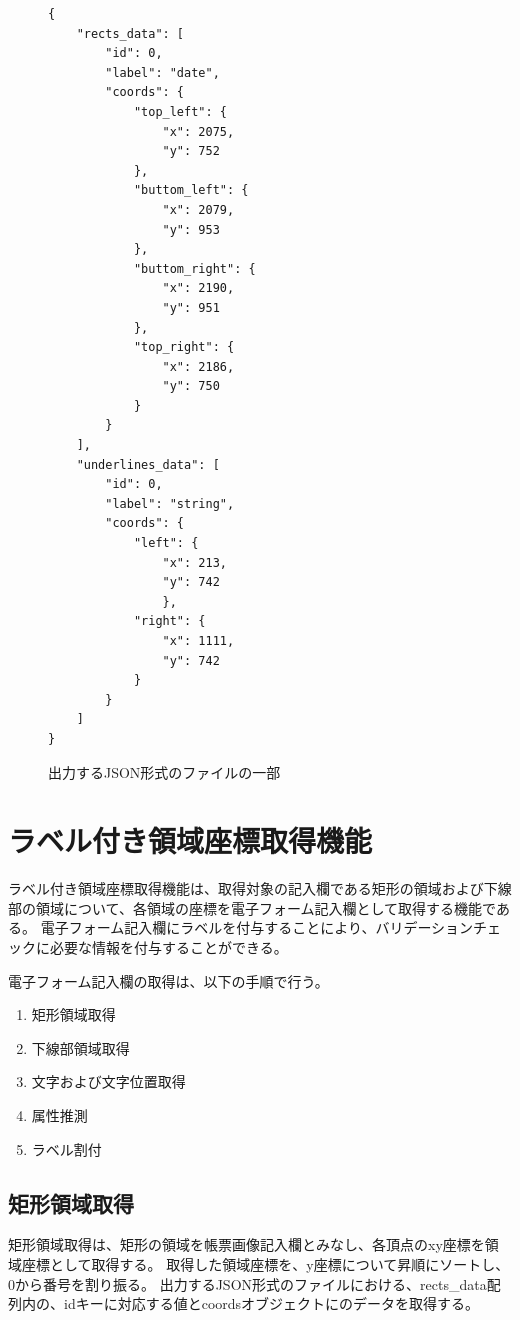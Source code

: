 \lstset{language=}
\begin{figure}[t]
    \begin{lstlisting}
{
    "rects_data": [
        "id": 0, 
        "label": "date",
        "coords": {
            "top_left": {
                "x": 2075,
                "y": 752
            },
            "buttom_left": {
                "x": 2079,
                "y": 953
            },
            "buttom_right": {
                "x": 2190,
                "y": 951
            },
            "top_right": {
                "x": 2186,
                "y": 750
            }
        }
    ],
    "underlines_data": [
        "id": 0,
        "label": "string",
        "coords": {
            "left": {
                "x": 213,
                "y": 742
                },
            "right": {
                "x": 1111,
                "y": 742
            }
        }
    ]
}
    \end{lstlisting}
    \caption{出力するJSON形式のファイルの一部}\label{fig:example_output_json}
\end{figure}

\section{ラベル付き領域座標取得機能}\label{sec:eform_write_space_obtainment_feature}
ラベル付き領域座標取得機能は、取得対象の記入欄である矩形の領域および下線部の領域について、各領域の座標を電子フォーム記入欄として取得する機能である。
電子フォーム記入欄にラベルを付与することにより、バリデーションチェックに必要な情報を付与することができる。

電子フォーム記入欄の取得は、以下の手順で行う。

\begin{enumerate}
    \item 矩形領域取得
    \item 下線部領域取得
    \item 文字および文字位置取得
    \item 属性推測
    \item ラベル割付
\end{enumerate}

\subsection{矩形領域取得}\label{subsec:rect_coords_obtainment}
矩形領域取得は、矩形の領域を帳票画像記入欄とみなし、各頂点のxy座標を領域座標として取得する。
取得した領域座標を、y座標について昇順にソートし、0から番号を割り振る。
出力するJSON形式のファイルにおける、rects\_data配列内の、idキーに対応する値とcoordsオブジェクトにのデータを取得する。

